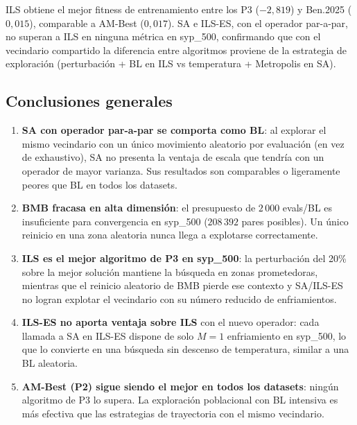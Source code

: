 \documentclass[12pt,a4paper]{article}
\begin{document}
ILS obtiene el mejor fitness de entrenamiento entre los P3 ($-2{,}819$) y Ben.2025
($0{,}015$), comparable a AM-Best ($0{,}017$). SA e ILS-ES, con el operador par-a-par,
no superan a ILS en ninguna métrica en syp\_500, confirmando que con el vecindario
compartido la diferencia entre algoritmos proviene de la estrategia de exploración
(perturbación + BL en ILS vs temperatura + Metropolis en SA).

\subsection{Conclusiones generales}

\begin{enumerate}
  \item \textbf{SA con operador par-a-par se comporta como BL}: al explorar el mismo
  vecindario con un único movimiento aleatorio por evaluación (en vez de exhaustivo),
  SA no presenta la ventaja de escala que tendría con un operador de mayor varianza.
  Sus resultados son comparables o ligeramente peores que BL en todos los datasets.

  \item \textbf{BMB fracasa en alta dimensión}: el presupuesto de $2\,000$ evals/BL es
  insuficiente para convergencia en syp\_500 ($208\,392$ pares posibles). Un único
  reinicio en una zona aleatoria nunca llega a explotarse correctamente.

  \item \textbf{ILS es el mejor algoritmo de P3 en syp\_500}: la perturbación del 20\%
  sobre la mejor solución mantiene la búsqueda en zonas prometedoras, mientras que el
  reinicio aleatorio de BMB pierde ese contexto y SA/ILS-ES no logran explotar el
  vecindario con su número reducido de enfriamientos.

  \item \textbf{ILS-ES no aporta ventaja sobre ILS} con el nuevo operador: cada llamada
  a SA en ILS-ES dispone de solo $M=1$ enfriamiento en syp\_500, lo que lo convierte
  en una búsqueda sin descenso de temperatura, similar a una BL aleatoria.

  \item \textbf{AM-Best (P2) sigue siendo el mejor en todos los datasets}: ningún
  algoritmo de P3 lo supera. La exploración poblacional con BL intensiva es más
  efectiva que las estrategias de trayectoria con el mismo vecindario.
\end{enumerate}

\end{document}
